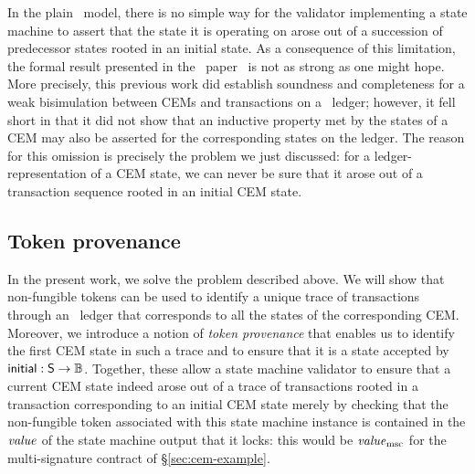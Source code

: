 In the plain \EUTXO\ model, there is no simple way for the validator implementing a state machine to assert that the state it is operating on arose out of a succession of predecessor states rooted in an initial state.
As a consequence of this limitation, the formal result presented in the \EUTXO\ paper~\cite{eutxo-1-paper} is not as strong as one might hope.
More precisely, this previous work did establish soundness and completeness for a weak bisimulation between CEMs and transactions on a \EUTXO\ ledger;
however, it fell short in that it did not show that an inductive property met by the states of a CEM may also be asserted for the corresponding states on the ledger.
The reason for this omission is precisely the problem we just discussed: for a ledger-representation of a CEM state, we can never be sure that it arose out of a transaction sequence rooted in an initial CEM state.

\subsection{Token provenance}
\label{sec:state-machine-provenance}

In the present work, we solve the problem described above. We will show that non-fungible tokens can be used to identify a unique trace of transactions through an \EUTXOma\ ledger that corresponds to all the states of the corresponding CEM. Moreover, we introduce a notion of \emph{token provenance} that enables us to identify the first CEM state in such a trace and to ensure that it is a state accepted by \(\textsf{initial} : \textsf{S} \rightarrow \mathbb{B}\). Together, these allow a state machine validator to ensure that a current CEM state indeed arose out of a trace of transactions rooted in a transaction corresponding to an initial CEM state merely by checking that the non-fungible token associated with this state machine instance is contained in the $\mathit{value}$ of the state machine output that it locks: this would be $\mathit{value}_{\mathrm{msc}}$ for the multi-signature contract of \S\ref{sec:cem-example}.
